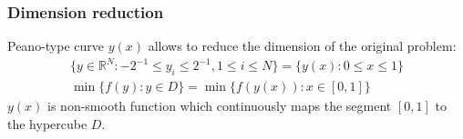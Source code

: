 \documentclass[aspectratio=1610]{beamer}
\begin{document}
\begin{frame}
  \begin{center}


  \frametitle{Dimension reduction}
  Peano-type curve \(y(x)\) allows to reduce the dimension of the original problem:
  \begin{gather}
    \lbrace y\in \mathbb{R}^N:-2^{-1}\leqslant y_i\leqslant 2^{-1},1\leqslant i\leqslant N\rbrace=\{y(x):0\leqslant x\leqslant 1\} \nonumber \\
    \min\{f(y): y\in D\}=\min\{f(y(x)): x\in [0,1]\} \nonumber
  \end{gather}
  \(y(x)\) is non-smooth function which continuously maps the segment \([0,1]\) to the hypercube \(D\).
  \begin{figure}[ht]
    \vspace*{-0.5cm}
  \end{figure}
\end{center}
\end{frame}
\end{document}

